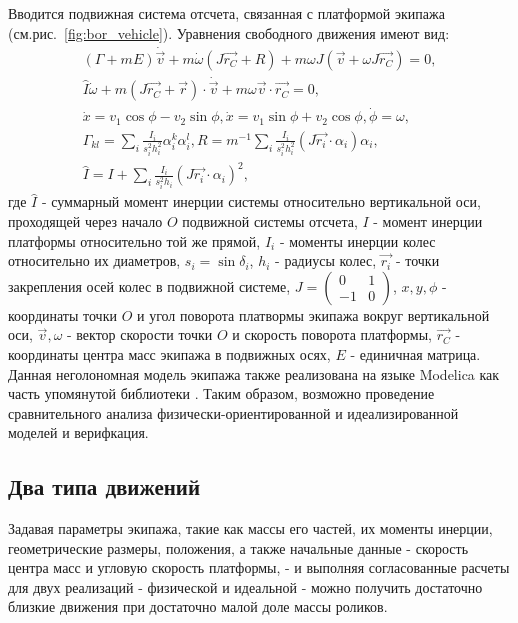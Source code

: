 \documentclass[12pt]{article}
\begin{document}
Вводится подвижная система отсчета, связанная с платформой экипажа (см.рис.~\ref{fig:bor_vehicle}). Уравнения свободного движения имеют вид:
\begin{eqnarray*}
(\Gamma+mE)\dot{\vec{v}} + m\dot{\omega}(J\vec{r_C}+R)+m\omega J(\vec{v} + \omega J\vec{r_C}) = 0,\\
\hat{I}\dot{\omega} + m(J\vec{r_C}+\vec{r})\cdot\dot{\vec{v}}+m\omega\vec{v}\cdot\vec{r_C} = 0,\\
\dot{x} = v_1\cos\phi - v_2\sin\phi, \dot{x} = v_1\sin\phi + v_2\cos\phi, \dot{\phi} = \omega,\\
\Gamma_{kl} = \sum_i \frac{I_i}{s_i^2 h_i^2}\alpha_i^k\alpha_i^l, R = m^{-1}\sum_i \frac{I_i}{s_i^2 h_i^2}(J\vec{r_i}\cdot \alpha_i) \alpha_i,\\
\hat{I} = I + \sum_i \frac{I_i}{s_i^2 h_i}(J\vec{r_i}\cdot \alpha_i)^2,
\end{eqnarray*}%
\newline
где $\hat{I}$ - суммарный момент инерции системы относительно вертикальной оси, проходящей через начало $O$ подвижной системы отсчета,\newline
$I$ - момент инерции платформы относительно той же прямой,\newline
$I_i$ - моменты инерции колес относительно их диаметров,\newline
$s_i = \sin\delta_i$, $h_i$ - радиусы колес,\newline
$\vec{r_i}$ - точки закрепления осей колес в подвижной системе,\newline
$J = \left(\begin{array}{cc}0 & 1\\-1 & 0\end{array}\right)$,\newline
$x,y,\phi$ - координаты точки $O$ и угол поворота платвормы экипажа вокруг вертикальной оси,\newline
$\vec{v}, \omega$ - вектор скорости точки $O$ и скорость поворота платформы,\newline
$\vec{r_C}$ - координаты центра масс экипажа в подвижных осях,
$E$ - единичная матрица.\\

Данная неголономная модель экипажа также реализована на языке Modelica \cite{ModelicaSpec} как часть упомянутой библиотеки \cite{kos5}. Таким образом, возможно проведение сравнительного анализа физически-ориентированной и идеализированной моделей и верифкация.

\subsection{Два типа движений}
Задавая параметры экипажа, такие как массы его частей, их моменты инерции, геометрические размеры, положения, а также начальные данные - скорость центра масс и угловую скорость платформы, - и выполняя согласованные расчеты для двух реализаций - физической и идеальной - можно получить достаточно близкие движения при достаточно малой доле массы роликов.\\
\end{document}
